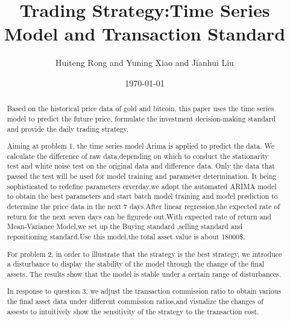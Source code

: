 \documentclass{mcmthesis}
\title{Trading Strategy:Time Series Model and Transaction Standard}
\author{\small Huiteng Rong and Yuning Xiao and Jianhui Liu}
\date{\today}
\begin{document}
\begin{abstract}
Based on the historical price data of gold and bitcoin, this paper uses the time series model to 
predict the future price, formulate the investment decision-making standard and provide the daily trading strategy.

Aiming at problem 1, the time series model Arima is applied to predict the data.
We calculate the difference of raw data,depending on which to 
 conduct the stationarity test and white noise test on the original data and difference data.
 Only the data that passed the test will be used for model training and parameter determination.
 It being sophisticated to redefine parameters erverday,we adopt the automated ARIMA model to obtain the best parameters 
 and start batch model training and model prediction to determine the price data in the next 7 days.After
 linear regression,the expected rate of return for the next seven days can be figurede out.With expected rate of return and 
 Mean-Variance Model,we set up the Buying standard ,selling standard and repositioning standard.Use this model,the total
 asset value is about 18000\$.

 For problem 2, in order to illustrate that the strategy is the best strategy,
  we introduce a disturbance to display the stability of the model through the change of the final assets. 
  The results show that the model is stable under a certain range of disturbances.
  
  In response to question 3, we adjust the transaction commission ratio to obtain various
  the final asset data under different commission ratios,and visualize the changes of assests to 
  intuitively show the sensitivity of the strategy to the transaction cost.


\end{abstract}
\end{document}
